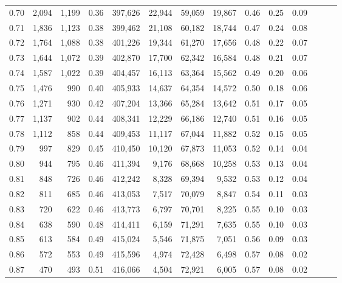 \begin{tabular}{rrrrrrrrrrrrrr}
0.70 &   2,094 &  1,199 &  0.36 &  397,626 &   22,944 &  59,059 &  19,867 &  0.46 &  0.25 &      0.09 \\
0.71 &   1,836 &  1,123 &  0.38 &  399,462 &   21,108 &  60,182 &  18,744 &  0.47 &  0.24 &      0.08 \\
0.72 &   1,764 &  1,088 &  0.38 &  401,226 &   19,344 &  61,270 &  17,656 &  0.48 &  0.22 &      0.07 \\
0.73 &   1,644 &  1,072 &  0.39 &  402,870 &   17,700 &  62,342 &  16,584 &  0.48 &  0.21 &      0.07 \\
0.74 &   1,587 &  1,022 &  0.39 &  404,457 &   16,113 &  63,364 &  15,562 &  0.49 &  0.20 &      0.06 \\
0.75 &   1,476 &    990 &  0.40 &  405,933 &   14,637 &  64,354 &  14,572 &  0.50 &  0.18 &      0.06 \\
0.76 &   1,271 &    930 &  0.42 &  407,204 &   13,366 &  65,284 &  13,642 &  0.51 &  0.17 &      0.05 \\
0.77 &   1,137 &    902 &  0.44 &  408,341 &   12,229 &  66,186 &  12,740 &  0.51 &  0.16 &      0.05 \\
0.78 &   1,112 &    858 &  0.44 &  409,453 &   11,117 &  67,044 &  11,882 &  0.52 &  0.15 &      0.05 \\
0.79 &     997 &    829 &  0.45 &  410,450 &   10,120 &  67,873 &  11,053 &  0.52 &  0.14 &      0.04 \\
0.80 &     944 &    795 &  0.46 &  411,394 &    9,176 &  68,668 &  10,258 &  0.53 &  0.13 &      0.04 \\
0.81 &     848 &    726 &  0.46 &  412,242 &    8,328 &  69,394 &   9,532 &  0.53 &  0.12 &      0.04 \\
0.82 &     811 &    685 &  0.46 &  413,053 &    7,517 &  70,079 &   8,847 &  0.54 &  0.11 &      0.03 \\
0.83 &     720 &    622 &  0.46 &  413,773 &    6,797 &  70,701 &   8,225 &  0.55 &  0.10 &      0.03 \\
0.84 &     638 &    590 &  0.48 &  414,411 &    6,159 &  71,291 &   7,635 &  0.55 &  0.10 &      0.03 \\
0.85 &     613 &    584 &  0.49 &  415,024 &    5,546 &  71,875 &   7,051 &  0.56 &  0.09 &      0.03 \\
0.86 &     572 &    553 &  0.49 &  415,596 &    4,974 &  72,428 &   6,498 &  0.57 &  0.08 &      0.02 \\
0.87 &     470 &    493 &  0.51 &  416,066 &    4,504 &  72,921 &   6,005 &  0.57 &  0.08 &      0.02 \\

\end{tabular}
